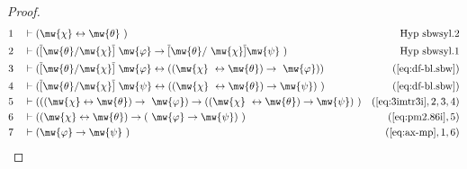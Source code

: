 \begin{proof}
\begin{align}
  1 &&  & \vdash ( \mw{\chi} \leftrightarrow \mw{\theta}
     ~)&\text{Hyp~sbwsyl.2}\notag%
  \\ 2 &&  & \vdash ( \overline{[} \mw{\theta} / \mw{\chi} \overline{]}
     ~\mw{\varphi} \rightarrow \overline{[} \mw{\theta} /
     ~\mw{\chi} \overline{]} \mw{\psi}
     ~)&\text{Hyp~sbwsyl.1}\notag%
  \\ 3 &&  & \vdash ( \overline{[} \mw{\theta} / \mw{\chi} \overline{]}
     ~\mw{\varphi} \leftrightarrow ( ( \mw{\chi}
     ~\leftrightarrow \mw{\theta} ) \rightarrow
     ~\mw{\varphi} ) )&(\mbox{\ref{eq:df-bl.sbw}})\notag
  \\ 4 &&  & \vdash ( \overline{[} \mw{\theta} / \mw{\chi} \overline{]}
     ~\mw{\psi} \leftrightarrow ( ( \mw{\chi}
     ~\leftrightarrow \mw{\theta} ) \rightarrow \mw{\psi} )
     ~)&(\mbox{\ref{eq:df-bl.sbw}})\notag
  \\ 5 &&  & \vdash ( ( ( \mw{\chi} \leftrightarrow \mw{\theta} ) \rightarrow
     ~\mw{\varphi} ) \rightarrow ( ( \mw{\chi}
     ~\leftrightarrow \mw{\theta} ) \rightarrow \mw{\psi} )
     ~)&(\mbox{\ref{eq:3imtr3i}},2,3,4)\notag
  \\ 6 &&  & \vdash ( ( \mw{\chi} \leftrightarrow \mw{\theta} ) \rightarrow (
     ~\mw{\varphi} \rightarrow \mw{\psi} )
     ~)&(\mbox{\ref{eq:pm2.86i}},5)\notag
  \\ 7 &&  & \vdash ( \mw{\varphi} \rightarrow \mw{\psi}
     ~)&(\mbox{\ref{eq:ax-mp}},1,6)\notag
\end{align}
\end{proof}


